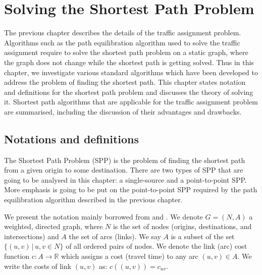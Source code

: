 \chapter{Solving the Shortest Path Problem} \label{chap:solvingspp}
The previous chapter describes the details of the traffic assignment problem.
Algorithms such as the path equilibration algorithm used to solve the traffic assignment require to solve the shortest path problem on a static graph, where the graph does not change while the shortest path is getting solved.
Thus in this chapter, we investigate 
various standard algorithms which have been developed 
to address the problem of finding the shortest path.
This chapter states notation and definitions for the shortest path problem and discusses
the theory of solving it.
Shortest path algorithms that are applicable for the traffic assignment problem are summarised,
including the discussion of their advantages and drawbacks.

\section{Notations and definitions}
The Shortest Path Problem (SPP) is the problem of finding the shortest path from a given origin  to some destination.
There are two types of SPP that are going to
be analysed in this chapter:
a single-source and a point-to-point SPP.  
More emphasis is going to be put on the point-to-point SPP required by the path equilibration algorithm described in the previous chapter.


We present the notation mainly borrowed from \citet{Cormen} and \citet{Klunder}.
We denote $ G = ( N, A ) $ a weighted, directed graph,
where $ N $ is the set of nodes (origins, destinations, and intersections)
and $ A $ the set of arcs (links).
We say $ A $ is a subset of the set $ \{ (u, v)\, | \, u, v \in N \} $ of all ordered pairs of nodes.
We denote the link (arc) cost function $ c : A \rightarrow \mathbb{R} $ which assigns a cost (travel time) to any arc $ (u,v) \in A $.
We write the costs of link $(u, v)$ as: $ c((u, v)) = c_{uv} $.

